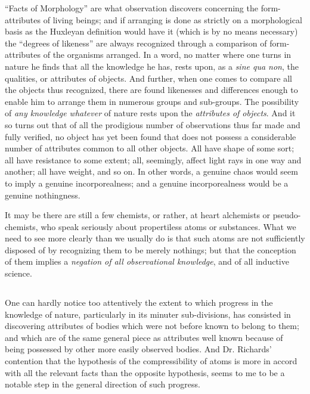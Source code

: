 \documentclass[a4paper, 11pt, oneside, polutonikogreek, english, landscape]{article}
\begin{document}
``Facts of Morphology'' are what observation discovers concerning the form-attributes of living beings; and if arranging is done as strictly on a morphological basis as the Huxleyan definition would have it (which is by no means necessary) the ``degrees of likeness'' are always recognized through a comparison of form-attributes of the organisms arranged. In a word, no matter where one turns in nature he finds that all the knowledge he has, rests upon, as a \emph{sine qua non}, the qualities, or attributes of objects. And further, when one comes to compare all the objects thus recognized, there are found likenesses and differences enough to enable him to arrange them in numerous groups and sub-groups. The possibility of \emph{any knowledge whatever} of nature rests upon the \emph{attributes of objects}. And it so turns out that of all the prodigious number of observations thus far made and fully verified, no object has yet been found that does not possess a considerable number of attributes common to all other objects. All have shape of some sort; all have resistance to some extent; all, seemingly, affect light rays in one way and another; all have weight, and so on. In other words, a genuine chaos would seem to imply a genuine incorporealness; and a genuine incorporealness would be a genuine nothingness.

It may be there are still a few chemists, or rather, at heart alchemists or pseudo-chemists, who speak seriously about propertiless atoms or substances. What we need to see more clearly than we usually do is that such atoms are not sufficiently disposed of by recognizing them to be merely nothings; but that the conception of them implies a \emph{negation of all observational knowledge}, and of all inductive science.

\subsection{}
\paragraph{}
One can hardly notice too attentively the extent to which progress in the knowledge of nature, particularly in its minuter sub-divisions, has consisted in discovering attributes of bodies which were not before known to belong to them; and which are of the same general piece as attributes well known because of being possessed by other more easily observed bodies. And Dr. Richards' contention that the hypothesis of the compressibility of atoms is more in accord with all the relevant facts than the opposite hypothesis, seems to me to be a notable step in the general direction of such progress.
\end{document}
